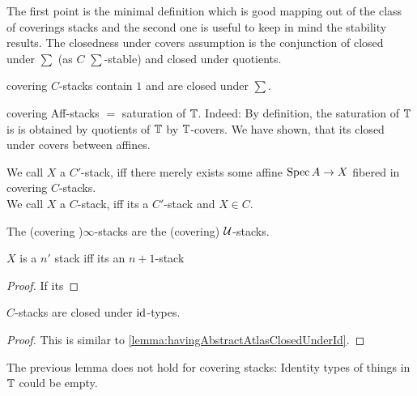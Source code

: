 The first point is the minimal definition which is good mapping out of the class of coverings stacks and the second one is useful to keep in mind the stability results.
The closedness under covers assumption is the conjunction of closed under $\sum$ (as $C$ $\sum$-stable) and closed under quotients. \\
\begin{lemma}
	covering $C$-stacks contain $1$ and are closed under $\sum$.
\end{lemma}


\begin{example}
	covering Aff-stacks $=$ saturation of $\mathbb{T}$. Indeed: By definition, the saturation of $\mathbb{T}$ is is obtained by quotients of $\mathbb{T}$ by $\mathbb{T}$-covers. We have shown, that its closed under covers between affines.
\end{example}

\begin{definition}
	We call $X$ a $C'$-stack, iff there merely exists some affine $\operatorname{Spec} A \to X$ fibered in covering $C$-stacks. \\
	We call $X$ a $C$-stack, iff its a $C'$-stack and $X \in C$.
\end{definition}
\begin{definition}
	The (covering )$\infty$-stacks are the (covering) $\mathcal{U}$-stacks.
\end{definition}
\begin{lemma}
	$X$ is a $n'$ stack iff its an $n+1$-stack
\end{lemma}
\begin{proof}
	If its 
\end{proof}
\begin{lemma}{\label{lemma:geometricStacksClosedUnderId}}
	$C$-stacks are closed under $\operatorname{id}$-types.
\end{lemma}
\begin{proof}
	
	This is similar to \ref{lemma:havingAbstractAtlasClosedUnderId}.
\end{proof}
\begin{warning}
	The previous lemma does not hold for covering stacks: Identity types of things in $\mathbb{T}$ could be empty.
\end{warning}

